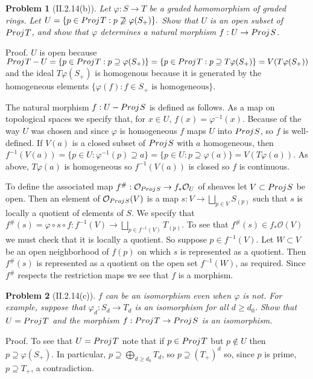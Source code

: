 \documentclass[12pt]{article}
\newcommand{\gp}{p}
\newcommand{\ga}{a}
\newcommand{\so}{\mathcal{O}}
\newtheorem{prob}{Problem}
\newcommand{\proj}{Proj \hspace{.01in}}
\newcommand{\proof}{\mbox{\sc Proof.\hspace{.1in}}}
\begin{document}
\begin{prob}[II.2.14(b)] Let $\varphi:S\rightarrow T$ be a graded homomorphism
of graded rings. Let 
$U=\{\gp \in \proj T : \gp \not\supseteq \varphi(S_{+})\}.$
Show that $U$ is an open subset of $\proj T$, and show that 
$\varphi$ determines a natural morphism $f:U\rightarrow\proj S$.
\end{prob}
\proof
$U$ is open because
$\proj T - U = \{\gp \in \proj T:\gp \supseteq \varphi(S_{+})\} 
=\{\gp \in \proj T : \gp \supseteq T\varphi(S_{+})\} 
=V(T\varphi(S_{+}))$
and the ideal $T\varphi(S_{+})$ is homogenous because it is generated
by the homogeneous elements $\{\varphi(f):f\in S_{+} \mbox{ is homogeneous}\}$.

The natural morphism $f:U-\proj S$ is defined as follows. As a map on 
topological spaces we specify that, for $x\in U$, $f(x)=\varphi^{-1}(x)$. 
Because of the way $U$ was chosen and since $\varphi$ is homogeneous
$f$ maps $U$ into $\proj S$, so $f$ is well-defined. If $V(\ga)$ is
a closed subset of $\proj S$ with $\ga$ homogeneous, then
$f^{-1}(V(\ga))=\{\gp\in U:\varphi^{-1}(\gp)\supseteq \ga\}
=\{\gp\in U:\gp \supseteq\varphi(\ga)\}=V(T\varphi(\ga)).$
As above, $T\varphi(\ga)$ is homogeneous so $f^{-1}(V(\ga))$ is
closed so $f$ is continuous.

To define the associated map $f^{\#}:\so_{\proj S} \rightarrow
f_{*}\so_{U}$ of sheaves let $V\subset \proj S$ be open. Then an
element of $\so_{\proj S}(V)$ is a map 
$s:V\rightarrow\bigsqcup_{p \in V}S_{(p)}$ such that $s$ is 
locally a quotient of elements of $S$. We specify that
$f^{\#}(s)=\varphi \circ s\circ f:f^{-1}(V)\rightarrow
\bigsqcup_{p\in f^{-1}(V)} T_{(p)}$. To see that 
$f^{\#}(s)\in f_{*}\so(V)$ we must check that it is locally
a quotient. So suppose $\gp\in f^{-1}(V).$ Let $W\subset V$ be
an open neighborhood of $f(\gp)$ on which $s$ is represented
as a quotient. Then $f^{\#}(s)$ is represented as a quotient on
the open set $f^{-1}(W)$, as required. Since $f^{\#}$ respects
the restriction maps we see that $f$ is a morphism.

\begin{prob}[II.2.14(c)]
$f$ can be an isomorphism even when $\varphi$ is not. For example,
suppose that $\varphi_d:S_d\rightarrow T_d$ is an isomorphism
for all $d\geq d_0$. Show that $U=\proj T$ and the morphism 
$f:\proj T\rightarrow \proj S$ is an isomorphism. 
\end{prob}
\proof
To see that $U=\proj T$ note that if $\gp \in \proj T$ but
$\gp \notin U$ then $\gp \supseteq \varphi(S_{+})$. In particular,
$\gp \supseteq \bigoplus_{d\geq d_0} T_d$, so 
$\gp \supseteq (T_{+})^d$ so, since $\gp$ is prime,
$\gp \supseteq T_{+}$, a contradiction. 
\end{document}
